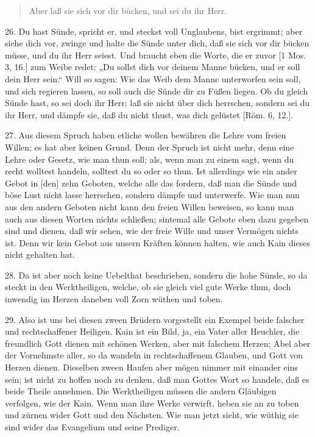 \begin{quote}
Aber laß sie sich vor dir bücken, und sei du ihr Herr.
\end{quote}

26. Du hast Sünde, spricht er, und steckst voll Unglaubens, bist ergrimmt; aber siehe dich vor, zwinge und halte die Sünde unter dich, daß sie sich vor dir bücken müsse, und du ihr Herr seiest. Und braucht eben die Worte, die er zuvor [1 Mos. 3, 16.] zum Weibe redet: „Du sollst dich vor deinem Manne bücken, und er soll dein Herr sein.“ Will so sagen: Wie das Weib dem Manne unterworfen sein soll, und sich regieren lassen, so soll auch die Sünde dir zu Füßen liegen. Ob du gleich Sünde hast, so sei doch ihr Herr; laß sie nicht über dich herrschen, sondern sei du ihr Herr, und dämpfe sie, daß du nicht thust, was dich gelüstet [Röm. 6, 12.].

27. Aus diesem Spruch haben etliche wollen bewähren die Lehre vom freien Willen; es hat aber keinen Grund. Denn der Spruch ist nicht mehr, denn eine Lehre oder Gesetz, wie man thun soll; als, wenn man zu einem sagt, wenn du recht wolltest handeln, solltest du so oder so thun. Ist allerdings wie ein ander Gebot in [den] zehn Geboten, welche alle das fordern, daß man die Sünde und böse Lust nicht lasse herrschen, sondern dämpfe und unterwerfe. Wie man nun aus den andern Geboten nicht kann den freien Willen beweisen, so kann man auch aus diesen Worten nichts schließen; sintemal alle Gebote eben dazu gegeben sind und dienen, daß wir sehen, wie der freie Wille und unser Vermögen nichts ist. Denn wir kein Gebot aus unsern Kräften können halten, wie auch Kain dieses nicht gehalten hat.

28. Da ist aber noch keine Uebelthat beschrieben, sondern die hohe Sünde, so da steckt in den Werktheiligen, welche, ob sie gleich viel gute Werke thun, doch inwendig im Herzen daneben voll Zorn wüthen und toben.

29. Also ist uns bei diesen zween Brüdern vorgestellt ein Exempel beide falscher und rechtschaffener Heiligen. Kain ist ein Bild, ja, ein Vater aller Heuchler, die freundlich Gott dienen mit schönen Werken, aber mit falschem Herzen; Abel aber der Vornehmste aller, so da wandeln in rechtschaffenem Glauben, und Gott von Herzen dienen. Dieselben zween Haufen aber mögen nimmer mit einander eins sein; ist nicht zu hoffen noch zu denken, daß man Gottes Wort so handele, daß es beide Theile annehmen. Die Werktheiligen müssen die andern Gläubigen verfolgen, wie der Kain. Wenn man ihre Werke verwirft, heben sie an zu toben und zürnen wider Gott und den Nächsten. Wie man jetzt sieht, wie wüthig sie sind wider das Evangelium und seine Prediger.

